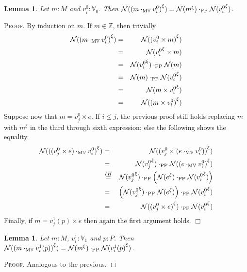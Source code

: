 \documentclass{article}
\newtheorem{lemma}[definition]{Lemma}
\newenvironment{proof}{\smallskip\textsc{Proof.}}{\hspace*{\fill}$\Box$}
\newcommand{\N}{{\cal N}}
\newcommand{\Z}{{\mathbb Z}}
\newcommand{\V}{{\mathbb V}}
\newcommand{\renamevar}[2]{\ensuremath{{#1}^{#2}}}
\newcommand{\multMV}{\ensuremath{\cdot_{\mathrm M\V}}}
\newcommand{\multPP}{\ensuremath{\cdot_{\mathrm{PP}}}}
\begin{document}
\begin{lemma}\label{multMVsubst0} Let $m:M$ and $v^0_i:\V_0$.  Then
$\N(\renamevar{(m\multMV v^0_i)}\xi)=\N(\renamevar m\xi)\multPP%
\N(\renamevar{v^0_i}\xi)$.
\end{lemma}
\begin{proof}
By induction on $m$.  If $m\in\Z$, then trivially
\begin{eqnarray*}
\N(\renamevar{(m\multMV v^0_i)}\xi) & = & \N(\renamevar{(v^0_i\times m)}\xi) \\
 & = & \N(\renamevar{v^0_i}\xi\times m) \\
 & = & \N(\renamevar{v^0_i}\xi)\multPP\N(m) \\
 & = & \N(m)\multPP\N(\renamevar{v^0_i}\xi) \\
 & = & \N(m\times\renamevar{v^0_i}\xi) \\
 & = & \N(\renamevar{(m\times v^0_i)}\xi)
\end{eqnarray*}
Suppose now that $m=v^0_j\times e$.  If $i\leq j$, the previous proof
still holds replacing $m$ with {\renamevar m\xi} in the third through
sixth expression; else the following shows the equality.
\begin{eqnarray*}
\N(\renamevar{((v^0_j\times e)\multMV v^0_i)}\xi)
 & = & \N(\renamevar{(v^0_j\times(e\multMV v^0_i))}\xi) \\
 & = & \N(\renamevar{v^0_j}\xi)\multPP\N(\renamevar{(e\multMV v^0_i)}\xi) \\
 & \stackrel{IH}= & \N(\renamevar{v^0_j}\xi)\multPP\left(%
   \N(\renamevar e\xi)\multPP\N(\renamevar{v^0_i}\xi)\right) \\
 & = & \left(\N(\renamevar{v^0_j}\xi)\multPP\N(\renamevar e\xi)\right)%
   \multPP\N(\renamevar{v^0_i}\xi) \\
 & = & \N(\renamevar{(v^0_j\times e)}\xi)\multPP\N(\renamevar{v^0_i}\xi)
\end{eqnarray*}
Finally, if $m=v^1_j(p)\times e$ then again the first argument holds.
\end{proof}

\begin{lemma}\label{multMVsubst1} Let $m:M$, $v^1_i:\V_1$ and $p:P$.  Then
$\N(\renamevar{(m\multMV v^1_i(p))}\xi)%
=\N(\renamevar m\xi)\multPP\N(\renamevar{v^1_i(p)}\xi)$.
\end{lemma}
\begin{proof}
Analogous to the previous.
\end{proof}
\end{document}
